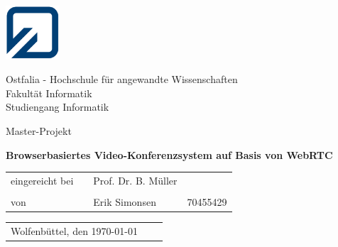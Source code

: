 \begin{minipage}{2.1cm}
	\includegraphics[width=2cm]{resources/fh_logo_klein.jpg}
\end{minipage}
\begin{minipage}{10.0cm}
	Ostfalia - Hochschule für angewandte Wissenschaften\\
	Fakultät Informatik\\
	Studiengang Informatik
\end{minipage}

\vspace{35mm}

\begin{center}
{\LARGE Master-Projekt}
	\\[10mm]
\end{center}

\begin{center}
	\LARGE \textbf{Browserbasiertes Video-Konferenzsystem auf Basis von WebRTC\\[28mm]}
\end{center}

\begin{table}[h]
	\centering
	\hspace{50mm}\begin{tabular}{lcll}
		eingereicht bei &  & Prof. Dr. B. Müller &          \\
		                &  &                     &          \\
		von             &  & Erik Simonsen     	 & 70455429 \\
		        
	\end{tabular}
\end{table}

\vspace{30mm}

\begin{table}[h]
	\begin{tabular}{lll}
		Wolfenbüttel, den \today\\
	\end{tabular}
\end{table}
\clearpage
